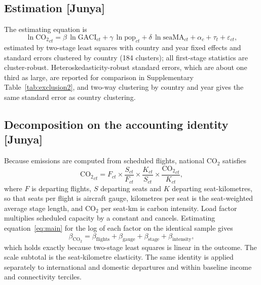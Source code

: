 \documentclass[12pt]{article}
\begin{document}
\subsection*{Estimation [Junya]}
The estimating equation is
\begin{equation}
\ln \mathrm{CO_2}_{ct} = \beta \,\ln \mathrm{GACI}_{ct}
 + \gamma \,\ln \mathrm{pop}_{ct} + \delta \,\ln \mathrm{seaMA}_{ct}
 + \alpha_c + \tau_t + \varepsilon_{ct},
\label{eq:main}
\end{equation}
estimated by two-stage least squares with country and year fixed effects
and standard errors clustered by country (184 clusters); all first-stage
statistics are cluster-robust. Heteroskedasticity-robust standard errors,
which are about one third as large, are reported for comparison in
Supplementary Table~\ref{tab:exclusion2}, and two-way clustering by
country and year gives the same standard error as country clustering.

\subsection*{Decomposition on the accounting identity [Junya]}
Because emissions are computed from scheduled flights, national CO$_2$
satisfies
\begin{equation}
\mathrm{CO_2}_{ct} = F_{ct} \times \frac{S_{ct}}{F_{ct}} \times
\frac{K_{ct}}{S_{ct}} \times \frac{\mathrm{CO_2}_{ct}}{K_{ct}},
\label{eq:identity}
\end{equation}
where $F$ is departing flights, $S$ departing seats and $K$ departing
seat-kilometres, so that seats per flight is aircraft gauge, kilometres per
seat is the seat-weighted average stage length, and CO$_2$ per seat-km is
carbon intensity. Load factor multiplies scheduled capacity by a constant
and cancels. Estimating equation~\ref{eq:main} for the log of each factor
on the identical sample gives
\begin{equation}
\beta_{\mathrm{CO_2}} = \beta_{\mathrm{flights}} + \beta_{\mathrm{gauge}} +
\beta_{\mathrm{stage}} + \beta_{\mathrm{intensity}},
\label{eq:decomp}
\end{equation}
which holds exactly because two-stage least squares is linear in the
outcome. The scale subtotal is the seat-kilometre elasticity. The same
identity is applied separately to international and domestic departures
and within baseline income and connectivity terciles.
\end{document}
